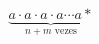 \documentclass[preview]{standalone}
\begin{document}
\begin{align*}
\underbrace{a \cdot a \cdot a \cdot a \cdots a *}_{n + m \text{ vezes}}
\end{align*}
\end{document}
